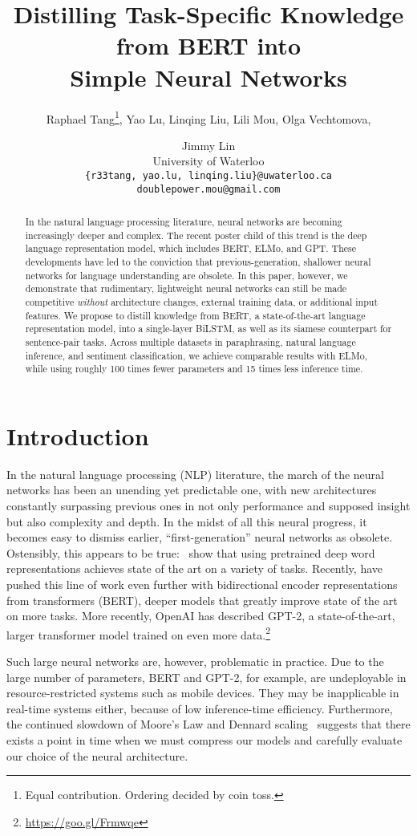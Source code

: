 \documentclass[11pt,a4paper]{article}
\title{Distilling Task-Specific Knowledge from BERT into\\ Simple Neural Networks}
\author{Raphael Tang\thanks{Equal contribution. Ordering decided by coin toss.}, \hspace{0.07cm} Yao Lu\footnotemark[1], \hspace{0.07cm} Linqing Liu\footnotemark[1], \hspace{0.07cm} Lili Mou, \hspace{0.07cm} Olga Vechtomova, \and Jimmy Lin\vspace{0.1cm}\\
 University of Waterloo\\
{\tt \{r33tang, yao.lu, linqing.liu\}@uwaterloo.ca}\\ {\tt doublepower.mou@gmail.com} \quad {\tt\{ovechtom, jimmylin\}@uwaterloo.ca}}
\begin{document}
\maketitle
\begin{abstract}
In the natural language processing literature, neural networks are becoming increasingly deeper and complex.
The recent poster child of this trend is the deep language representation model, which includes BERT, ELMo, and GPT.
These developments have led to the conviction that previous-generation, shallower neural networks for language understanding are obsolete.
In this paper, however, we demonstrate that rudimentary, lightweight neural networks can still be made competitive \textit{without} architecture changes, external training data, or additional input features.
We propose to distill knowledge from BERT, a state-of-the-art language representation model, into a single-layer BiLSTM, as well as its siamese counterpart for sentence-pair tasks.
Across multiple datasets in paraphrasing, natural language inference, and sentiment classification, we achieve comparable results with ELMo, while using roughly 100 times fewer parameters and 15 times less inference time.

\end{abstract}

\section{Introduction}

 In the natural language processing (NLP) literature, the march of the neural networks has been an unending yet predictable one, with new architectures constantly surpassing previous ones in not only performance and supposed insight but also complexity and depth.
 In the midst of all this neural progress, it becomes easy to dismiss earlier, ``first-generation'' neural networks as obsolete.
 Ostensibly, this appears to be true:~\citet{peters2018deep} show that using pretrained deep word representations achieves state of the art on a variety of tasks.
 Recently, \citet{devlin2018bert} have pushed this line of work even further with bidirectional encoder representations from transformers (BERT), deeper models that greatly improve state of the art on more tasks.
 More recently, OpenAI has described GPT-2, a state-of-the-art, larger transformer model trained on even more data.\footnote{\url{https://goo.gl/Frmwqe}}
 
Such large neural networks are, however, problematic in practice. Due to the large number of parameters, BERT and GPT-2, for example, are undeployable in resource-restricted systems such as mobile devices. They may be inapplicable in real-time systems either, because of low inference-time efficiency. Furthermore, the continued slowdown of Moore's Law and Dennard scaling~\cite{han2017efficient} suggests that there exists a point in time when we must compress our models and carefully evaluate our choice of the neural architecture.
\end{document}
